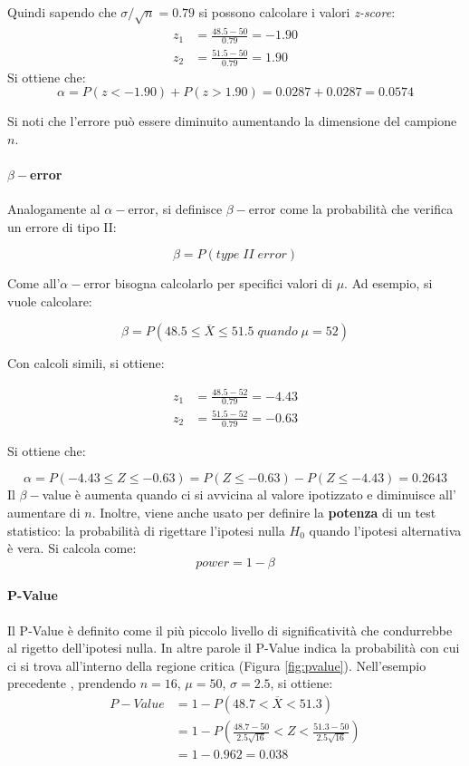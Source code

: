 \documentclass{article}
\begin{document}
Quindi sapendo che $\sigma / \sqrt{n} = 0.79$ si possono calcolare i valori \textit{z-score}:
\begin{align*}
  z_1 &= \displaystyle\frac{48.5-50}{0.79} = -1.90\\
  z_2 &= \displaystyle\frac{51.5-50}{0.79} = 1.90
\end{align*}
Si ottiene che:
\begin{equation*}
  \alpha = P(z < -1.90) + P(z > 1.90) = 0.0287 + 0.0287 = 0.0574 
\end{equation*}

Si noti che l'errore può essere diminuito aumentando la dimensione del campione $n$.
\paragraph{$\beta-$error}
Analogamente al $\alpha-$error, si definisce $\beta-$error come la probabilità che 
verifica un errore di tipo II:

$$\beta = P(type\; II\; error)$$

Come all'$\alpha-$error bisogna calcolarlo per specifici valori di $\mu$. Ad 
esempio, si vuole calcolare:

$$\beta = P(48.5 \leq \overline{X} \leq 51.5\; quando\; \mu = 52)$$

Con calcoli simili, si ottiene:

\begin{align*}
  z_1 &= \displaystyle\frac{48.5-52}{0.79} = -4.43\\
  z_2 &= \displaystyle\frac{51.5-52}{0.79} = -0.63
\end{align*}

Si ottiene che:

\begin{equation*}
  \alpha = P( -4.43 \leq Z \leq -0.63) = P(Z\leq -0.63) - P(Z\leq-4.43) = 0.2643 
\end{equation*}
Il $\beta-$value è aumenta quando ci si avvicina al valore ipotizzato e diminuisce all'
aumentare di $n$. Inoltre, viene anche usato per definire la \textbf{potenza} di un test 
statistico: la probabilità di rigettare l'ipotesi nulla $H_0$ quando l'ipotesi alternativa 
è vera. Si calcola come:
$$  power = 1 - \beta $$

\paragraph{P-Value}
Il P-Value è definito come il più piccolo livello di significatività che condurrebbe al 
rigetto dell'ipotesi nulla. In altre parole il P-Value indica la probabilità con cui ci 
si trova all'interno della regione critica (Figura \ref{fig:pvalue}). Nell'esempio precedente
, prendendo $n=16$, $\mu = 50$, $\sigma = 2.5$, si ottiene:
\begin{align*}
  P-Value &= 1 - P(48.7 < \overline{X} < 51.3) \\
  &= 1 - P\left(\displaystyle\frac{48.7 - 50}{2.5\sqrt{16}} < Z < \displaystyle\frac{
    51.3 - 50}{2.5\sqrt{16}}\right) \\
  &= 1 - 0.962 = 0.038
\end{align*}
\end{document}
